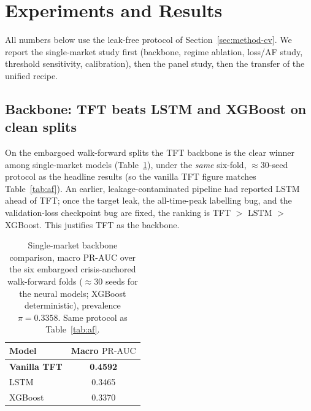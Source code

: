 \documentclass[11pt,a4paper]{article}
\newcommand{\prauc}{\mbox{PR-AUC}}
\begin{document}
\section{Experiments and Results}
\label{sec:results}

All numbers below use the leak-free protocol of Section~\ref{sec:method-cv}.
We report the single-market study first (backbone, regime ablation, loss/AF
study, threshold sensitivity, calibration), then the panel study, then the
transfer of the unified recipe.

\subsection{Backbone: TFT beats LSTM and XGBoost on clean splits}
\label{sec:res-backbone}
On the embargoed walk-forward splits the TFT backbone is the clear winner
among single-market models (Table~\ref{tab:backbone}), under the \emph{same}
six-fold, $\approx$30-seed protocol as the headline results (so the vanilla TFT
figure matches Table~\ref{tab:af}). An earlier, leakage-contaminated pipeline
had reported LSTM ahead of TFT; once the target leak, the all-time-peak
labelling bug, and the validation-loss checkpoint bug are fixed, the ranking is
TFT $>$ LSTM $>$ XGBoost. This justifies TFT as the backbone.

\begin{table}[h]
\centering\small
\caption{Single-market backbone comparison, macro $\prauc$ over the six
embargoed crisis-anchored walk-forward folds ($\approx$30 seeds for the
neural models; XGBoost deterministic), prevalence $\pi=0.3358$. Same
protocol as Table~\ref{tab:af}.}
\label{tab:backbone}
\begin{tabular}{lc}
\toprule
Model & Macro $\prauc$ \\
\midrule
\textbf{Vanilla TFT} & \textbf{0.4592} \\
LSTM & 0.3465 \\
XGBoost & 0.3370 \\
\bottomrule
\end{tabular}
\end{table}
\end{document}
